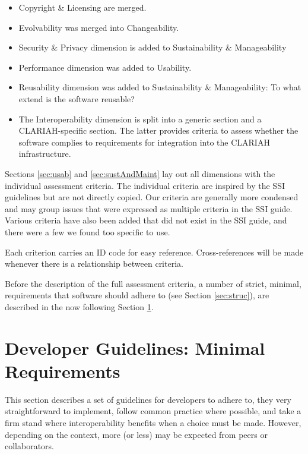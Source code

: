 \documentclass[a4paper,11pt]{article}
\begin{document}
\begin{itemize}
\item Copyright \& Licensing are merged.
\item Evolvability was merged into Changeability.
\item Security \& Privacy dimension is added to Sustainability \& Manageability
\item Performance dimension was added to Usability.
\item Reusability dimension was added to Sustainability \& Manageability: To what extend is the software reusable?
%
%
%
\item The Interoperability dimension is split into a generic section and a
    CLARIAH-specific section. The latter provides criteria to assess
whether the software complies to requirements for integration into the CLARIAH infrastructure.
\end{itemize}

Sections \ref{sec:usab} and \ref{sec:sustAndMaint} lay out all dimensions with the individual assessment
criteria. The individual criteria are inspired by the SSI guidelines but
are not directly copied. Our criteria are generally more condensed and may
group issues that were expressed as multiple criteria in the SSI guide.
Various criteria have also been added that did not exist in the SSI guide,
and there were a few we found too specific to use.

Each criterion carries an ID code for easy reference. Cross-references will be
made whenever there is a relationship between criteria.

Before the description of the full assessment criteria, a number of strict,
minimal, requirements that software should adhere to (see Section
\ref{sec:struc}), are described in the now following Section \ref{sec:req}.

\section{Developer Guidelines: Minimal Requirements}\label{sec:req}

This section describes a set of guidelines for developers to adhere to, they
very straightforward to implement, follow common practice where possible,
and take a firm stand where interoperability benefits when a choice must be
made. However, depending on the context, more (or less) may be expected from
peers or collaborators.
\end{document}
